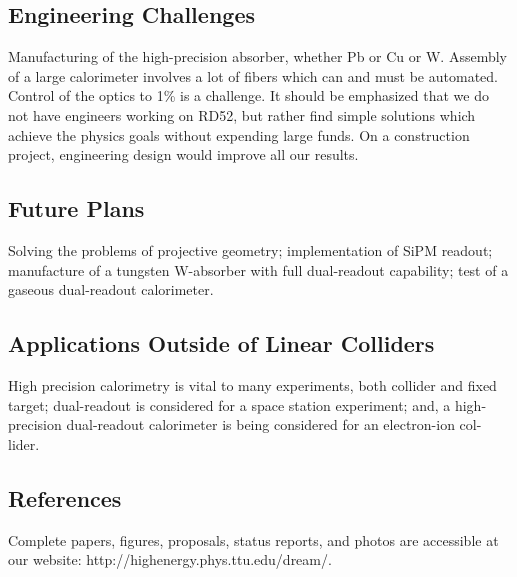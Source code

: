 \subsection{Engineering Challenges}
Manufacturing of the high-precision absorber, whether Pb or Cu or W. Assembly of a large calorimeter involves a lot of fibers which can and must be automated. Control of the optics to 1\% is a challenge. It should be emphasized that we do not have engineers working on RD52, but rather find simple solutions which achieve the physics goals without expending large funds. On a construction project, engineering design would improve all our results.
\subsection{Future Plans}
Solving the problems of projective geometry; implementation of SiPM readout; manufacture of a tungsten W-absorber with full dual-readout capability; test of a gaseous dual-readout calorimeter.
\subsection{Applications Outside of Linear Colliders}
High precision calorimetry is vital to many experiments, both collider and fixed target; dual-readout is considered for a space station experiment; and, a high-precision dual-readout calorimeter is being considered for an electron-ion col- lider.
\subsection{References}
Complete papers, figures, proposals, status reports, and photos are accessible at our website: http://highenergy.phys.ttu.edu/dream/.
